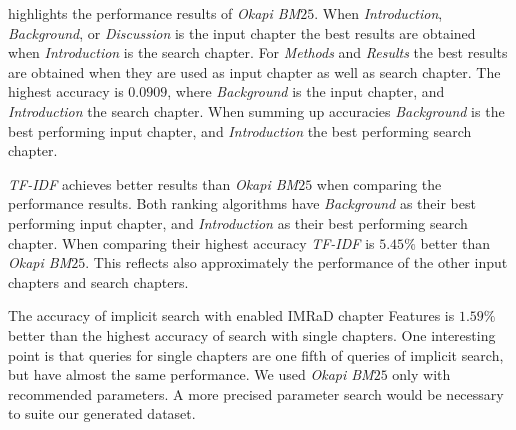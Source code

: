  highlights the performance results of \textit{Okapi BM$25$}. When \textit{Introduction}, \textit{Background}, or \textit{Discussion} is the input chapter the best results are obtained when \textit{Introduction} is the search chapter. For \textit{Methods} and \textit{Results} the best results are obtained when they are used as input chapter as well as search chapter. The highest accuracy is $0.0909$, where \textit{Background} is the input chapter, and \textit{Introduction} the search chapter. When summing up accuracies \textit{Background} is the best performing input chapter, and \textit{Introduction} the best performing search chapter.

\textit{TF-IDF} achieves better results than \textit{Okapi BM$25$} when comparing the performance results. Both ranking algorithms have \textit{Background} as their best performing input chapter, and \textit{Introduction} as their best performing search chapter. When comparing their highest accuracy \textit{TF-IDF} is $5.45 \%$ better than \textit{Okapi BM$25$}. This reflects also approximately the performance of the other input chapters and search chapters.

The accuracy of implicit search with enabled IMRaD chapter Features is $1.59 \%$ better than the highest accuracy of search with single chapters. One interesting point is that queries for single chapters are one fifth of queries of implicit search, but have almost the same performance. We used \textit{Okapi BM$25$} only with recommended parameters. A more precised parameter search would be necessary to suite our generated dataset.